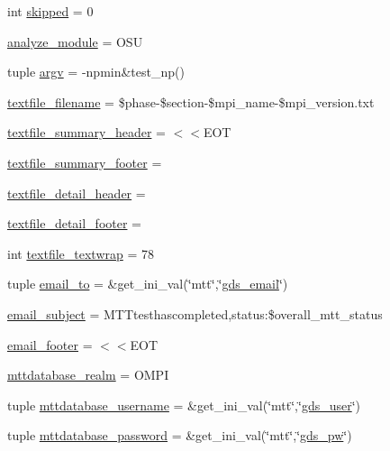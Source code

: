 \begin{DoxyCompactItemize}
\item 
int \hyperlink{namespacegds-demo_a09c460047a7a72cd72b03a892e16804b}{skipped} = 0
\item 
\hyperlink{namespacegds-demo_adedb86c1208d06a5408c0c8266f63670}{analyze\-\_\-module} = O\-S\-U
\item 
tuple \hyperlink{namespacegds-demo_ac0172e0836a56b7aaec9bb9d5a697bcd}{argv} = -\/npmin\&test\-\_\-np()
\item 
\hyperlink{namespacegds-demo_a210b065329c1196c2b4205f4e4e8db53}{textfile\-\_\-filename} = \$phase-\/\$section-\/\$mpi\-\_\-name-\/\$mpi\-\_\-version.\-txt
\item 
\hyperlink{namespacegds-demo_a211b7a2e48808f11b61bcb2bae18d23f}{textfile\-\_\-summary\-\_\-header} = $<$$<$E\-O\-T
\item 
\hyperlink{namespacegds-demo_a7791b144751668f4a2bd3aabde7ec607}{textfile\-\_\-summary\-\_\-footer} =
\item 
\hyperlink{namespacegds-demo_a58b62d7de4b3e126d25d88e6cdb438cf}{textfile\-\_\-detail\-\_\-header} =
\item 
\hyperlink{namespacegds-demo_a7b2740aecad3e48a8252e41b8e4e0aac}{textfile\-\_\-detail\-\_\-footer} =
\item 
int \hyperlink{namespacegds-demo_aaaa191ed09a9a9150e323f1f49713812}{textfile\-\_\-textwrap} = 78
\item 
tuple \hyperlink{namespacegds-demo_a758502074a250507a71dd1afdd3cf50c}{email\-\_\-to} = \&get\-\_\-ini\-\_\-val(\char`\"{}mtt\char`\"{},\char`\"{}\hyperlink{namespacegds-demo_a46212fa747c3d30872b524a4c5c62084}{gds\-\_\-email}\char`\"{})
\item 
\hyperlink{namespacegds-demo_a772ba8c6d51a7d3574b66d2dfd4194a5}{email\-\_\-subject} = M\-T\-Ttesthascompleted,status\-:\$overall\-\_\-mtt\-\_\-status
\item 
\hyperlink{namespacegds-demo_a131b88d6f8596699cad6b6501edee00e}{email\-\_\-footer} = $<$$<$E\-O\-T
\item 
\hyperlink{namespacegds-demo_af97c95f0978e6f297cd4893962369a06}{mttdatabase\-\_\-realm} = O\-M\-P\-I
\item 
tuple \hyperlink{namespacegds-demo_a74802c727b9ae23b038625a85efa3d73}{mttdatabase\-\_\-username} = \&get\-\_\-ini\-\_\-val(\char`\"{}mtt\char`\"{},\char`\"{}\hyperlink{namespacegds-demo_aa9c2bc4e0238cad5803c9b33aace1e59}{gds\-\_\-user}\char`\"{})
\item 
tuple \hyperlink{namespacegds-demo_aa5503d77b2af640cee7a9cddf64d32af}{mttdatabase\-\_\-password} = \&get\-\_\-ini\-\_\-val(\char`\"{}mtt\char`\"{},\char`\"{}\hyperlink{namespacegds-demo_ae8f847cfa457e3ef0c5fa370200cf06c}{gds\-\_\-pw}\char`\"{})

\end{DoxyCompactItemize}
